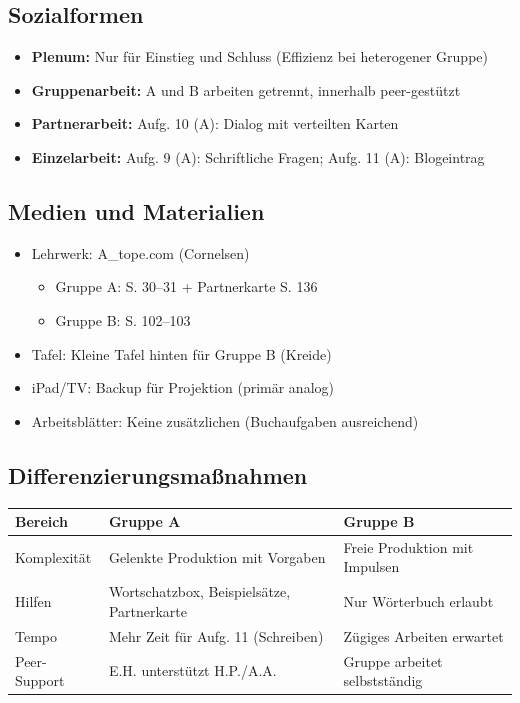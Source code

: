 \documentclass[11pt,a4paper]{article}
\begin{document}
\subsection{Sozialformen}
\begin{itemize}
    \item \textbf{Plenum:} Nur für Einstieg und Schluss (Effizienz bei heterogener Gruppe)
    \item \textbf{Gruppenarbeit:} A und B arbeiten getrennt, innerhalb peer-gestützt
    \item \textbf{Partnerarbeit:} Aufg. 10 (A): Dialog mit verteilten Karten
    \item \textbf{Einzelarbeit:} Aufg. 9 (A): Schriftliche Fragen; Aufg. 11 (A): Blogeintrag
\end{itemize}

\subsection{Medien und Materialien}
\begin{itemize}
    \item Lehrwerk: A\_tope.com (Cornelsen)
    \begin{itemize}
        \item Gruppe A: S. 30--31 + Partnerkarte S. 136
        \item Gruppe B: S. 102--103
    \end{itemize}
    \item Tafel: Kleine Tafel hinten für Gruppe B (Kreide)
    \item iPad/TV: Backup für Projektion (primär analog)
    \item Arbeitsblätter: Keine zusätzlichen (Buchaufgaben ausreichend)
\end{itemize}

\subsection{Differenzierungsmaßnahmen}

\begin{tabular}{|p{3cm}|p{5cm}|p{5cm}|}
\hline
\textbf{Bereich} & \textbf{Gruppe A} & \textbf{Gruppe B} \\
\hline
Komplexität & Gelenkte Produktion mit Vorgaben & Freie Produktion mit Impulsen \\
\hline
Hilfen & Wortschatzbox, Beispielsätze, Partnerkarte & Nur Wörterbuch erlaubt \\
\hline
Tempo & Mehr Zeit für Aufg. 11 (Schreiben) & Zügiges Arbeiten erwartet \\
\hline
Peer-Support & E.H. unterstützt H.P./A.A. & Gruppe arbeitet selbstständig \\
\hline
\end{tabular}
\end{document}
